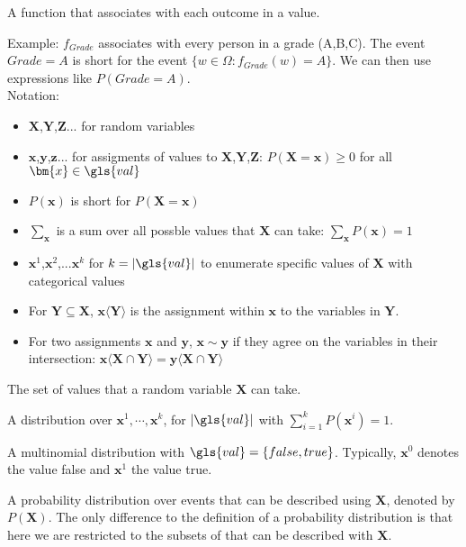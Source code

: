 {%
  A function that associates with each outcome in  a value.

  Example: $f_{Grade}$ associates with every person in  a grade (A,B,C). The event $Grade=A$ is short for the event $\{w\in\Omega:f_{Grade}(w)=A\}$. We can then use expressions like $P(Grade=A)$.\\

  Notation:
  \begin{itemize}
    \item $\bm{X}$,$\bm{Y}$,$\bm{Z}$... for random variables
    \item $\bm{x}$,$\bm{y}$,$\bm{z}$... for assigments of values to  $\bm{X}$,$\bm{Y}$,$\bm{Z}$: $P(\bm{X}=\bm{x})\geq0 $ for all $\bm{x}\in \gls{val}$
    \item $P(\bm{x})$ is short for $P(\bm{X}=\bm{x})$
    \item $\sum_{\bm{x}}$ is a sum over all possble values that $\bm{X}$ can take: $\sum_{\bm{x}}P(\bm{x})=1$
    \item $\bm{x}^1$,$\bm{x}^2$,...$\bm{x}^k$ for $k=|\gls{val}|$ to enumerate specific values of $\bm{X}$ with categorical values
    \item For $\bm{Y}\subseteq\bm{X}$, $\bm{x}\langle\bm{Y}\rangle$ is the assignment within $\bm{x}$ to the variables in $\bm{Y}$.
    \item For two assignments $\bm{x}$ and $\bm{y}$, $\bm{x}\sim\bm{y}$ if they agree on the variables in their intersection: $\bm{x}\langle\bm{X}\cap\bm{Y}\rangle=\bm{y}\langle\bm{X}\cap\bm{Y}\rangle$
  \end{itemize}
}

{%
  The set of values that a \gls{random variable} $\bm{X}$ can take.
}

{%
  A distribution over $\bm{x}^1,\cdots,\bm{x}^k$, for $|\gls{val}|$ with $\sum_{i=1}^k P(\bm{x}^i)=1$.
}

{%
  A \gls{multinomial distribution} with $\gls{val}=\{false,true\}$. Typically, $\bm{x}^0$ denotes the value false and $\bm{x}^1$ the value true.
}

{%
  A \gls{probability distribution} over events that can be described using $\bm{X}$, denoted by $P(\bm{X})$. The only difference to the definition of a \gls{probability distribution} is that here we are restricted to the subsets of  that can be described with $\bm{X}$.
}

